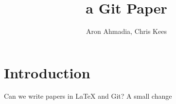 \documentclass[12pt]{article}
\author{Aron Ahmadia, Chris Kees} \title{a Git Paper}
\begin{document}
\maketitle

\section{Introduction}

Can we write papers in LaTeX and Git?
A small change
\end{document}
